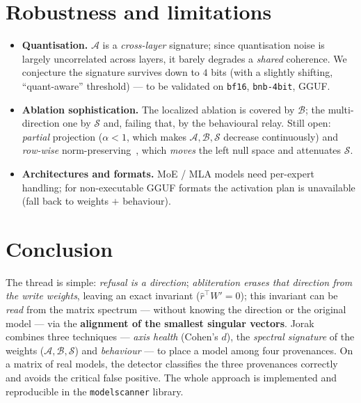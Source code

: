 \documentclass[11pt,a4paper]{article}
\theoremstyle{definition}
\theoremstyle{plain}
\newcommand{\rhat}{\hat{r}}
\begin{document}
\section{Robustness and limitations}\label{sec:robustesse}
\begin{itemize}\itemsep2pt
  \item \textbf{Quantisation.} $\mathcal{A}$ is a \emph{cross-layer} signature; since
  quantisation noise is largely uncorrelated across layers, it barely degrades a
  \emph{shared} coherence. We conjecture the signature survives down to $4$ bits (with
  a slightly shifting, ``quant-aware'' threshold) — to be validated on \texttt{bf16},
  \texttt{bnb-4bit}, GGUF.
  \item \textbf{Ablation sophistication.} The localized ablation is covered by
  $\mathcal{B}$; the multi-direction one by $\mathcal{S}$ and, failing that, by the
  behavioural relay. Still open: \emph{partial} projection ($\alpha<1$, which makes
  $\mathcal{A},\mathcal{B},\mathcal{S}$ decrease continuously) and \emph{row-wise}
  norm-preserving~\cite{dang2026,grimjim}, which \emph{moves} the left null space and attenuates
  $\mathcal{S}$.
  \item \textbf{Architectures and formats.} MoE / MLA models need per-expert handling;
  for non-executable GGUF formats the activation plan is unavailable (fall back to
  weights $+$ behaviour).
\end{itemize}

\section{Conclusion}
The thread is simple: \emph{refusal is a direction}; \emph{abliteration erases that
direction from the write weights}, leaving an exact invariant ($\rhat^\top W'=0$);
this invariant can be \emph{read} from the matrix spectrum — without knowing the
direction or the original model — via the \textbf{alignment of the smallest singular
vectors}. Jorak combines three techniques — \emph{axis health} (Cohen's $d$), the
\emph{spectral signature} of the weights ($\mathcal{A},\mathcal{B},\mathcal{S}$) and
\emph{behaviour} — to place a model among four provenances. On a matrix of real
models, the detector classifies the three provenances correctly and avoids the
critical false positive. The whole approach is implemented and reproducible in the
\texttt{modelscanner} library.
\end{document}
